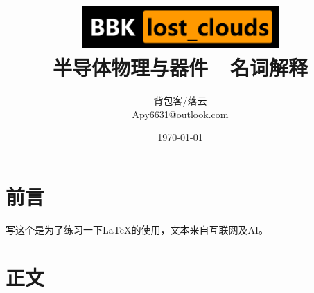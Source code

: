 \documentclass{report}          %
\title{
    \includegraphics[width=7.91cm,height=1.64cm]{logo.png}
    \\
    \textbf{\CJKfamily{黑体}\fontsize{26pt}{39pt} 半导体物理与器件---名词解释}
}
\author{                        %
    背包客/落云\\                %
    Apy6631@outlook.com         %
}
\date{\today}                   %
\begin{document}

\maketitle                      %

\thispagestyle{empty}           %


\clearpage                      %

\thispagestyle{empty}

\tableofcontents                %

\thispagestyle{empty}

\clearpage                      %

\section{前言}                  %

\begin{center}
    写这个是为了练习一下LaTeX的使用，文本来自互联网及AI。
\end{center}

\setcounter{page}{1}            %

\clearpage                      %

\section{正文}
\end{document}
